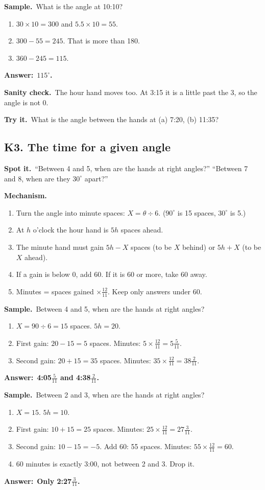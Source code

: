 \documentclass[11pt,a4paper]{article}
\let\oldsubsection\subsection
\renewcommand{\subsection}{\needspace{9\baselineskip}\oldsubsection}
\newcommand{\spot}{\textbf{\color{ember}Spot it.}\ }
\newcommand{\mech}{\textbf{\color{ember}Mechanism.}\ }
\newif\ifkeepsamp
\newcommand{\ans}[1]{\par\nopagebreak\noindent\textbf{\color{ember}Answer:}\ \textbf{#1}\par}
\newcommand{\samp}{\ifkeepsamp\needspace{4\baselineskip}\fi\textbf{\color{ember}Sample.}\ }
\newcommand{\sane}{\textbf{\color{slate}Sanity check.}\ }
\newcommand{\tryit}[1]{\textbf{\color{ember}Try it.}\ #1}
\begin{document}
\samp What is the angle at 10:10?
\begin{enumerate}
\item $30 \times 10 = 300$ and $5.5 \times 10 = 55$.
\item $300 - 55 = 245$. That is more than 180.
\item $360 - 245 = 115$.
\end{enumerate}
\ans{$115^\circ$.}

\sane The hour hand moves too. At 3:15 it is a little past the 3, so the angle is not 0.

\tryit What is the angle between the hands at (a) 7:20, (b) 11:35?

\subsection{K3. The time for a given angle}
\spot ``Between 4 and 5, when are the hands at right angles?'' ``Between 7 and 8, when are they $30^\circ$ apart?''

\mech
\begin{enumerate}
\item Turn the angle into minute spaces: $X = \theta \div 6$. ($90^\circ$ is 15 spaces, $30^\circ$ is 5.)
\item At $h$ o'clock the hour hand is $5h$ spaces ahead.
\item The minute hand must gain $5h - X$ spaces (to be $X$ behind) or $5h + X$ (to be $X$ ahead).
\item If a gain is below 0, add 60. If it is 60 or more, take 60 away.
\item Minutes = spaces gained $\times \tfrac{12}{11}$. Keep only answers under 60.
\end{enumerate}

\samp Between 4 and 5, when are the hands at right angles?
\begin{enumerate}
\item $X = 90 \div 6 = 15$ spaces. $5h = 20$.
\item First gain: $20 - 15 = 5$ spaces. Minutes: $5 \times \tfrac{12}{11} = 5\tfrac5{11}$.
\item Second gain: $20 + 15 = 35$ spaces. Minutes: $35 \times \tfrac{12}{11} = 38\tfrac2{11}$.
\end{enumerate}
\ans{4:05$\tfrac5{11}$ and 4:38$\tfrac2{11}$.}

\samp Between 2 and 3, when are the hands at right angles?
\begin{enumerate}
\item $X = 15$. $5h = 10$.
\item First gain: $10 + 15 = 25$ spaces. Minutes: $25 \times \tfrac{12}{11} = 27\tfrac3{11}$.
\item Second gain: $10 - 15 = -5$. Add 60: 55 spaces. Minutes: $55 \times \tfrac{12}{11} = 60$.
\item 60 minutes is exactly 3:00, not between 2 and 3. Drop it.
\end{enumerate}
\ans{Only 2:27$\tfrac3{11}$.}
\end{document}
